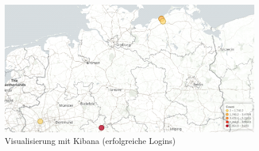 \begin{figure}[htbp]
    \caption{Visualisierung mit Kibana (erfolgreiche Logins)}
    \label{pic:elk-02}\vspace{0.2cm}
    \centering
    \includegraphics[scale=0.33]{img/elk-02}  
\end{figure}